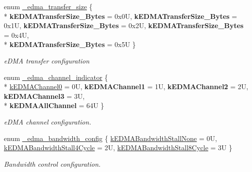 \begin{DoxyCompactItemize}
\item 
enum \hyperlink{group__edma__hal_ga4ffcbd8f86285f5c162ae70a6fe155bd}{\+\_\+edma\+\_\+transfer\+\_\+size} \{ \\*
{\bfseries k\+E\+D\+M\+A\+Transfer\+Size\+\_\+Bytes} = 0x0U, 
{\bfseries k\+E\+D\+M\+A\+Transfer\+Size\+\_\+Bytes} = 0x1U, 
{\bfseries k\+E\+D\+M\+A\+Transfer\+Size\+\_\+Bytes} = 0x2U, 
{\bfseries k\+E\+D\+M\+A\+Transfer\+Size\+\_\+Bytes} = 0x4U, 
\\*
{\bfseries k\+E\+D\+M\+A\+Transfer\+Size\+\_\+Bytes} = 0x5U
 \}\hypertarget{group__edma__hal_ga4ffcbd8f86285f5c162ae70a6fe155bd}{}\label{group__edma__hal_ga4ffcbd8f86285f5c162ae70a6fe155bd}
\begin{DoxyCompactList}\small\item\em e\+D\+MA transfer configuration \end{DoxyCompactList}
\item 
enum \hyperlink{group__edma__hal_ga345c5302dbe76db009c0240e1e325797}{\+\_\+edma\+\_\+channel\+\_\+indicator} \{ \\*
\hyperlink{group__edma__hal_gga345c5302dbe76db009c0240e1e325797afe39d576f30be63283d3e6e848f7bba5}{k\+E\+D\+M\+A\+Channel0} = 0U, 
{\bfseries k\+E\+D\+M\+A\+Channel1} = 1U, 
{\bfseries k\+E\+D\+M\+A\+Channel2} = 2U, 
{\bfseries k\+E\+D\+M\+A\+Channel3} = 3U, 
\\*
{\bfseries k\+E\+D\+M\+A\+All\+Channel} = 64U
 \}\begin{DoxyCompactList}\small\item\em e\+D\+MA channel configuration. \end{DoxyCompactList}
\item 
enum \hyperlink{group__edma__hal_ga82ff0dd938b1e22cb64cfa9e42929c31}{\+\_\+edma\+\_\+bandwidth\+\_\+config} \{ \hyperlink{group__edma__hal_gga82ff0dd938b1e22cb64cfa9e42929c31af46c62a5d66009cc2044686ee929fe9d}{k\+E\+D\+M\+A\+Bandwidth\+Stall\+None} = 0U, 
\hyperlink{group__edma__hal_gga82ff0dd938b1e22cb64cfa9e42929c31a4d4d354f9915accd4ab274cef525e7fe}{k\+E\+D\+M\+A\+Bandwidth\+Stall4\+Cycle} = 2U, 
\hyperlink{group__edma__hal_gga82ff0dd938b1e22cb64cfa9e42929c31ace96f42ec8428f1df985acfdc5452fe8}{k\+E\+D\+M\+A\+Bandwidth\+Stall8\+Cycle} = 3U
 \}\begin{DoxyCompactList}\small\item\em Bandwidth control configuration. \end{DoxyCompactList}
\end{DoxyCompactItemize}
